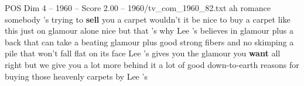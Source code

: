 \begin{textsample}{POS Dim 4 – 1960 – Score 2.00 – 1960/tv\_com\_1960\_82.txt}  \label{ex:f4_pos_008}
ah romance somebody 's trying to \textbf{sell} you a carpet wouldn't it be nice to buy a carpet like this just on glamour alone nice but that 's why Lee 's believes in glamour plus a back that can take a beating glamour plus good strong fibers and no skimping a pile that won't fall flat on its face Lee 's gives you the glamour you \textbf{want} all right but we give you a lot more behind it a lot of good down-to-earth reasons for buying those heavenly carpets by Lee 's

\end{textsample}
